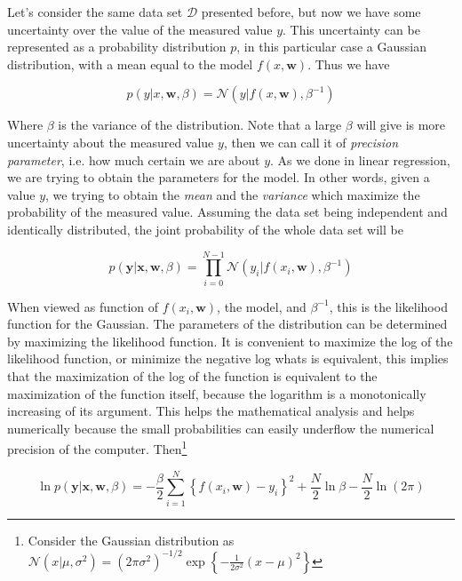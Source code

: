 \documentclass[11pt]{article} %
\begin{document}
Let's consider the same data set $\mathcal{D}$ presented before, but now we have some uncertainty over the value of the measured value $y$. This uncertainty can be represented as a probability distribution $p$, in this particular case a Gaussian distribution, with a mean equal to the model $f(x,\mathbf{w})$. Thus we have

\begin{equation}
   \label{eq:bay-cur-fit-1}
   p(y | x, \mathbf{w}, \beta)=\mathcal{N}\left(y | f(x, \mathbf{w}), \beta^{-1}\right)
\end{equation}

Where $\beta$ is the variance of the distribution. Note that a large $\beta$ will give is more uncertainty about the measured value $y$, then we can call it of \textit{precision parameter}, i.e. how much certain we are about $y$. As we done in linear regression, we are trying to obtain the parameters for the model. In other words, given a value $y$, we trying to obtain the \textit{mean} and the \textit{variance} which maximize the probability of the measured value. Assuming the data set being independent and identically distributed, the joint probability of the whole data set will be

\begin{equation}
   p(\mathbf{y} | \mathbf{x}, \mathbf{w}, \beta)= \prod_{i=0}^{N-1} \mathcal{N}\left(y_i | f(x_i, \mathbf{w}), \beta^{-1}\right)
\end{equation}

When viewed as function of $f(x_i, \mathbf{w})$, the model, and $\beta^{-1}$, this is the likelihood function for the Gaussian. The parameters of the distribution can be determined by maximizing the likelihood function. It is convenient to maximize the log of the likelihood function, or minimize the negative log whats is equivalent, this implies that the maximization of the log of the function is equivalent to the maximization of the function itself, because the logarithm is a monotonically increasing of its argument. This helps the mathematical analysis and helps numerically because the small probabilities can easily underflow the numerical precision of the computer. Then\footnote[2]{Consider the Gaussian distribution as $\mathcal{N}\left(x | \mu, \sigma^{2}\right)=\left(2 \pi \sigma^{2}\right)^{-1 / 2} \exp \left\{-\frac{1}{2 \sigma^{2}}(x-\mu)^{2}\right\}$}

\begin{equation}
   \label{eq:bay-reg-ml-function}
   \ln p(\mathbf{y} | \mathbf{x}, \mathbf{w}, \beta)=-\frac{\beta}{2} \sum_{i=1}^{N}\left\{f\left(x_{i}, \mathbf{w}\right)-y_{i}\right\}^{2}+\frac{N}{2} \ln \beta-\frac{N}{2} \ln (2 \pi)
\end{equation}
\end{document}
